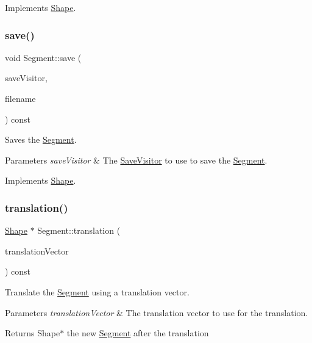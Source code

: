Implements \hyperlink{class_shape_abfc7a673b8a6d9a4d646dc15c771aa0d}{Shape}.

\hypertarget{class_segment_a76c475fb193a0d7bb987da60dfc88ccd}{}\label{class_segment_a76c475fb193a0d7bb987da60dfc88ccd} 
\subsubsection{\texorpdfstring{save()}{save()}}
{\footnotesize\ttfamily void Segment\+::save (\begin{DoxyParamCaption}\item[{const \hyperlink{class_save_visitor}{Save\+Visitor} $\ast$}]{save\+Visitor,  }\item[{const string \&}]{filename }\end{DoxyParamCaption}) const\hspace{0.3cm}{\ttfamily [virtual]}}

Saves the \hyperlink{class_segment}{Segment}. 
\begin{DoxyParams}{Parameters}
{\em save\+Visitor} & The \hyperlink{class_save_visitor}{Save\+Visitor} to use to save the \hyperlink{class_segment}{Segment}. \\
\hline
\end{DoxyParams}


Implements \hyperlink{class_shape_ae1477829e1b06aad805b8b76312f87bc}{Shape}.

\hypertarget{class_segment_a8592ee9b864b2ebc61ab1810fa7dc577}{}\label{class_segment_a8592ee9b864b2ebc61ab1810fa7dc577} 
\subsubsection{\texorpdfstring{translation()}{translation()}}
{\footnotesize\ttfamily \hyperlink{class_shape}{Shape} $\ast$ Segment\+::translation (\begin{DoxyParamCaption}\item[{const \hyperlink{class_vector2_d}{Vector2D} \&}]{translation\+Vector }\end{DoxyParamCaption}) const\hspace{0.3cm}{\ttfamily [virtual]}}

Translate the \hyperlink{class_segment}{Segment} using a translation vector. 
\begin{DoxyParams}{Parameters}
{\em translation\+Vector} & The translation vector to use for the translation. \\
\hline
\end{DoxyParams}
\begin{DoxyReturn}{Returns}
Shape$\ast$ the new \hyperlink{class_segment}{Segment} after the translation 
\end{DoxyReturn}


